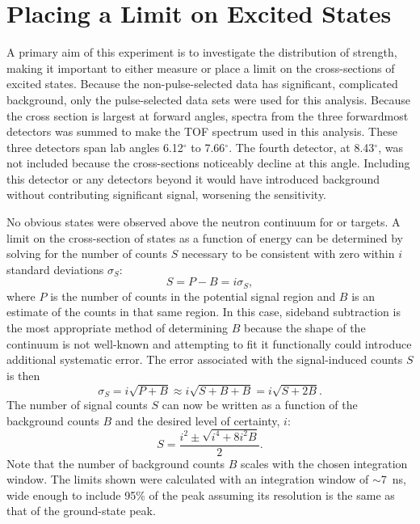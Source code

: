 \section{Placing a Limit on Excited \zp States}
\label{sec:zpLimit}

A primary aim of this experiment is to investigate the distribution of \zp strength, making it important to either measure or place a limit on the cross-sections of excited \zp states.  Because the non-pulse-selected data has significant, complicated background, only the pulse-selected data sets were used for this analysis.  Because the \zp cross section is largest at forward angles, spectra from the three forwardmost detectors was summed to make the TOF spectrum used in this analysis.  These three detectors span lab angles 6.12$^{\circ}$ to 7.66$^{\circ}$.  The fourth detector, at 8.43$^{\circ}$, was not included because the \zp cross-sections noticeably decline at this angle.  Including this detector or any detectors beyond it would have introduced background without contributing significant signal, worsening the sensitivity.    

No obvious \zp states were observed above the neutron continuum for  or  targets.  A limit on the cross-section of \zp states as a function of energy can be determined by solving for the number of counts $S$ necessary to be consistent with zero within $i$ standard deviations $\sigma_S$:
\begin{equation}
S = P - B = i\sigma_S,
\end{equation}
where $P$ is the number of counts in the potential signal region and $B$ is an estimate of the counts in that same region.  In this case, sideband subtraction is the most appropriate method of determining $B$ because the shape of the continuum is not well-known and attempting to fit it functionally could introduce additional systematic error.  The error associated with the signal-induced counts $S$ is then
\begin{equation}
\sigma_S = i\sqrt{P+B} \approx i\sqrt{S+B+B} = i\sqrt{S+2B}.
\end{equation}
The number of signal counts $S$ can now be written as a function of the background counts $B$ and the desired level of certainty, $i$:
\begin{equation}
S = \frac{i^2 \pm \sqrt{i^4 + 8i^2B}}{2}.
\end{equation}
Note that the number of background counts $B$ scales with the chosen integration window.  The limits shown were calculated with an integration window of $\sim$7~ns, wide enough to include 95\% of the peak assuming its resolution is the same as that of the ground-state peak.

